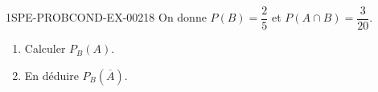 \begin{exercice}{1SPE-PROBCOND-EX-002}{1}{8}
On donne $P(B) = \dfrac{2}{5}$ et $P(A \cap B) = \dfrac{3}{20}$.

\begin{enumerate}
  \item Calculer $P_B(A)$.
  \item En déduire $P_B(\overline{A})$.
\end{enumerate}
\end{exercice}

